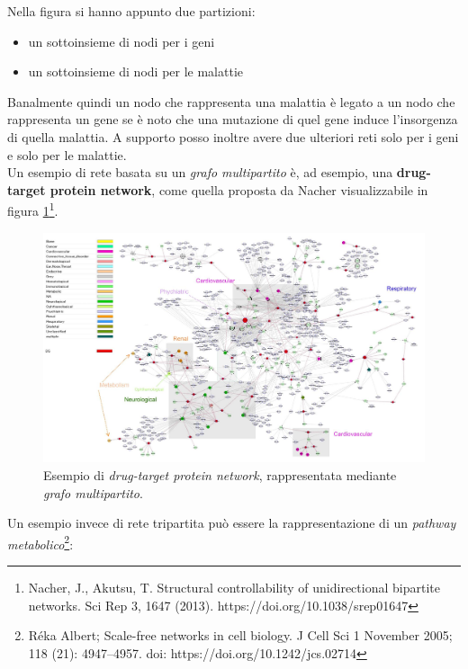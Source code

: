 \documentclass[a4paper,12pt, oneside]{book}
\begin{document}
Nella figura si hanno appunto due partizioni: 
\begin{itemize}
  \item un sottoinsieme di nodi per i geni
  \item un sottoinsieme di nodi per le malattie
\end{itemize}
Banalmente quindi un nodo che rappresenta una malattia è legato a un nodo che
rappresenta un gene se è noto che una
mutazione di quel gene induce l'insorgenza di quella malattia. A supporto posso
inoltre avere due ulteriori reti solo per i geni e solo per le malattie.\\
Un esempio di rete basata su un \textit{grafo multipartito} è, ad esempio, una
\textbf{drug-target protein network}, come quella proposta da
Nacher visualizzabile in figura
\ref{fig:mbip}\footnote{Nacher, J., Akutsu, T. Structural controllability of
  unidirectional bipartite networks. Sci Rep 3, 1647
  (2013). https://doi.org/10.1038/srep01647}.
\begin{figure}
  \centering
  \includegraphics[scale = 0.22]{img/multi.jpg}
  \caption{Esempio di \textit{drug-target protein network}, rappresentata
    mediante \textit{grafo multipartito}.}  
  \label{fig:mbip}
\end{figure}
\newpage
Un esempio invece di rete tripartita può essere la rappresentazione di un
\textit{pathway metabolico}\footnote{Réka Albert; Scale-free networks in cell
  biology. J Cell Sci 1 November 2005; 118 (21): 4947–4957. doi:
  https://doi.org/10.1242/jcs.02714}: 
\end{document}
